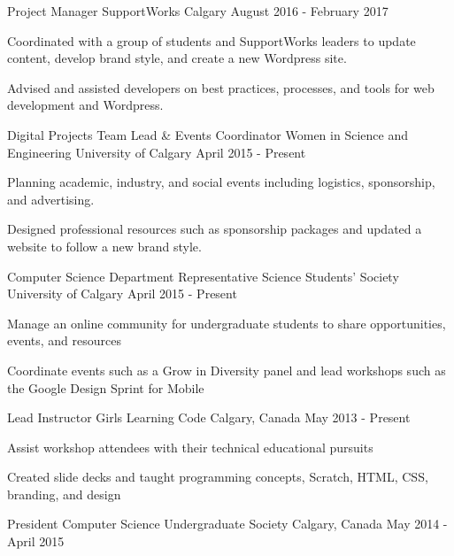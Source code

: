 \begin{cventries}
  \cventry
    {Project Manager}
    {SupportWorks}
    {Calgary}
    {August 2016 - February 2017}
    {
      \begin{cvitems}
        \item {Coordinated with a group of students and SupportWorks leaders to update content, develop brand style, and create a new Wordpress site.}
        \item {Advised and assisted developers on best practices, processes, and tools for web development and Wordpress.}
      \end{cvitems}
    }
  \cventry
    {Digital Projects Team Lead \& Events Coordinator}
    {Women in Science and Engineering}
    {University of Calgary}
    {April 2015 - Present}
    {
      \begin{cvitems}
        \item {Planning academic, industry, and social events including logistics, sponsorship, and advertising.}
        \item {Designed professional resources such as sponsorship packages and updated a website to follow a new brand style.}
      \end{cvitems}
    }
  \cventry
    {Computer Science Department Representative}
    {Science Students' Society}
    {University of Calgary}
    {April 2015 - Present}
    {
      \begin{cvitems}
        \item {Manage an online community for undergraduate students to share opportunities, events, and resources}
        \item {Coordinate events such as a Grow in Diversity panel and lead workshops such as the Google Design Sprint for Mobile}
      \end{cvitems}
    }
  \cventry
    {Lead Instructor}
    {Girls Learning Code}
    {Calgary, Canada}
    {May 2013 - Present}
    {
      \begin{cvitems}
        \item {Assist workshop attendees with their technical educational pursuits}
        \item {Created slide decks and taught programming concepts, Scratch, HTML, CSS, branding, and design}
      \end{cvitems}
    }
  \cventry
    {President}
    {Computer Science Undergraduate Society}
    {Calgary, Canada}
    {May 2014 - April 2015}
    {
      \begin{cvitems}

\end{cvitems}}
\end{cventries}
